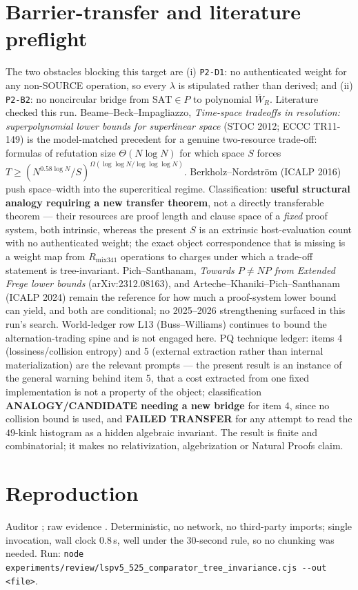 \documentclass[11pt]{article}
\begin{document}
\section*{Barrier-transfer and literature preflight}
The two obstacles blocking this target are (i) \texttt{P2-D1}: no authenticated weight for any non-SOURCE operation, so every $\lambda$ is stipulated rather than derived; and (ii) \texttt{P2-B2}: no noncircular bridge from $\mathrm{SAT}\in P$ to polynomial $\overline W_{R}$. Literature checked this run. Beame--Beck--Impagliazzo, \emph{Time-space tradeoffs in resolution: superpolynomial lower bounds for superlinear space} (STOC 2012; ECCC TR11-149) is the model-matched precedent for a genuine two-resource trade-off: formulas of refutation size $\Theta(N\log N)$ for which space $S$ forces $T\ge(N^{0.58\log N}/S)^{\Omega(\log\log N/\log\log\log N)}$. Berkholz--Nordstr\"om (ICALP 2016) push space--width into the supercritical regime. Classification: \textbf{useful structural analogy requiring a new transfer theorem}, not a directly transferable theorem --- their resources are proof length and clause space of a \emph{fixed} proof system, both intrinsic, whereas the present $S$ is an extrinsic host-evaluation count with no authenticated weight; the exact object correspondence that is missing is a weight map from $R_{\mathrm{mix341}}$ operations to charges under which a trade-off statement is tree-invariant. Pich--Santhanam, \emph{Towards $P\ne NP$ from Extended Frege lower bounds} (arXiv:2312.08163), and Arteche--Khaniki--Pich--Santhanam (ICALP 2024) remain the reference for how much a proof-system lower bound can yield, and both are conditional; no 2025--2026 strengthening surfaced in this run's search. World-ledger row L13 (Buss--Williams) continues to bound the alternation-trading spine and is not engaged here. PQ technique ledger: items 4 (lossiness/collision entropy) and 5 (external extraction rather than internal materialization) are the relevant prompts --- the present result is an instance of the general warning behind item 5, that a cost extracted from one fixed implementation is not a property of the object; classification \textbf{ANALOGY/CANDIDATE needing a new bridge} for item 4, since no collision bound is used, and \textbf{FAILED TRANSFER} for any attempt to read the $49$-kink histogram as a hidden algebraic invariant. The result is finite and combinatorial; it makes no relativization, algebrization or Natural Proofs claim.

\section*{Reproduction}
Auditor ; raw evidence . Deterministic, no network, no third-party imports; single invocation, wall clock $0.8$\,s, well under the 30-second rule, so no chunking was needed. Run: \verb|node experiments/review/lspv5_525_comparator_tree_invariance.cjs --out <file>|.
\end{document}
